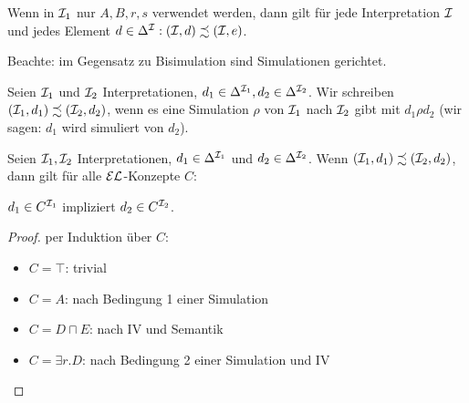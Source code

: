 \begin{tafel}
\begin{center}
    \end{center}
    Wenn in $\mathcal{I}_1$ nur $A, B, r, s$ verwendet werden, dann gilt für jede Interpretation $\mathcal{I}$ und jedes Element $d \in \Delta^{\mathcal{I}}: (\mathcal{I}, d) \precsim (\mathcal{I}, e)$.
\end{tafel}

Beachte: im Gegensatz zu Bisimulation sind Simulationen gerichtet.

Seien $\mathcal{I}_1$ und $\mathcal{I}_2$ Interpretationen, $d_1 \in \Delta^{\mathcal{I}_1}, d_2 \in  \Delta^{\mathcal{I}_2}$. Wir schreiben  $(\mathcal{I}_1,d_1) \precsim (\mathcal{I}_2,d_2)$, wenn es eine Simulation $\rho$ von $\mathcal{I}_1$ nach $\mathcal{I}_2$ gibt mit $d_1 \rho d_2$ (wir sagen: $d_1$ wird simuliert von $d_2$).

\begin{theorem}
Seien $\mathcal{I}_1,\mathcal{I}_2$ Interpretationen, $d_1 \in \Delta^{\mathcal{I}_1}$ und
$d_2 \in \Delta^{\mathcal{I}_2}$. Wenn
$(\mathcal{I}_1,d_1) \precsim (\mathcal{I}_2,d_2)$, dann
gilt für alle $\mathcal{E}\mathcal{L}$-Konzepte $C$:
\begin{center}
$d_1 \in C^{\mathcal{I}_1}$ impliziert $d_2 \in C^{\mathcal{I}_2}$.
\end{center}
\end{theorem}
\begin{tafel}
    \begin{proof}
    per Induktion über $C$:
    \begin{itemize}
        \item $C=\top$: trivial
        \item $C=A$: nach Bedingung 1 einer Simulation
        \item $C=D\sqcap E$: nach IV und Semantik
        \item $C=\exists r.D$: nach Bedingung 2 einer Simulation und IV
    \end{itemize}
\end{proof}
\end{tafel}

